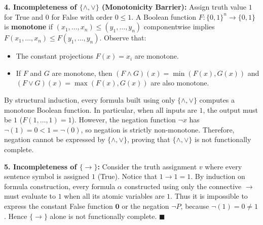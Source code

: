 \begin{solution}
\textbf{4. Incompleteness of $\{\land, \lor\}$ (Monotonicity Barrier):}
Assign truth value $1$ for True and $0$ for False with order $0 \le 1$.
A Boolean function $F: \{0,1\}^n \to \{0,1\}$ is \textbf{monotone} if $(x_1, \dots, x_n) \le (y_1, \dots, y_n)$ componentwise implies $F(x_1, \dots, x_n) \le F(y_1, \dots, y_n)$.
Observe that:
\begin{itemize}[leftmargin=1.2em,itemsep=1pt]
  \item The constant projections $F(x) = x_i$ are monotone.
  \item If $F$ and $G$ are monotone, then $(F \land G)(x) = \min(F(x), G(x))$ and $(F \lor G)(x) = \max(F(x), G(x))$ are also monotone.
\end{itemize}
By structural induction, every formula built using only $\{\land, \lor\}$ computes a monotone Boolean function.
In particular, when all inputs are $1$, the output must be $1$ ($F(1, \dots, 1) = 1$).
However, the negation function $\neg x$ has $\neg(1) = 0 < 1 = \neg(0)$, so negation is strictly non-monotone.
Therefore, negation cannot be expressed by $\{\land, \lor\}$, proving that $\{\land, \lor\}$ is not functionally complete.

\textbf{5. Incompleteness of $\{\to\}$:}
Consider the truth assignment $v$ where every sentence symbol is assigned $1$ (True).
Notice that $1 \to 1 = 1$.
By induction on formula construction, every formula $\alpha$ constructed using only the connective $\to$ must evaluate to $1$ when all its atomic variables are $1$.
Thus it is impossible to express the constant False function $\mathbf{0}$ or the negation $\neg P$, because $\neg(1) = 0 \ne 1$.
Hence $\{\to\}$ alone is not functionally complete. \hfill $\blacksquare$
\end{solution}

